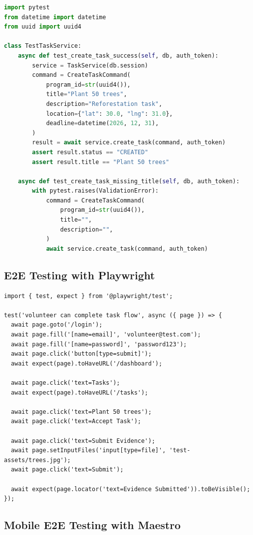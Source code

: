 \documentclass[11pt,a4paper]{article}
\begin{document}
\begin{lstlisting}[language=Python, caption=Unit Test Example]
import pytest
from datetime import datetime
from uuid import uuid4

class TestTaskService:
    async def test_create_task_success(self, db, auth_token):
        service = TaskService(db.session)
        command = CreateTaskCommand(
            program_id=str(uuid4()),
            title="Plant 50 trees",
            description="Reforestation task",
            location={"lat": 30.0, "lng": 31.0},
            deadline=datetime(2026, 12, 31),
        )
        result = await service.create_task(command, auth_token)
        assert result.status == "CREATED"
        assert result.title == "Plant 50 trees"

    async def test_create_task_missing_title(self, db, auth_token):
        with pytest.raises(ValidationError):
            command = CreateTaskCommand(
                program_id=str(uuid4()),
                title="",
                description="",
            )
            await service.create_task(command, auth_token)
\end{lstlisting}

\subsection{E2E Testing with Playwright}

\begin{lstlisting}[language={[Sharp]C}, caption=Web E2E Test]
import { test, expect } from '@playwright/test';

test('volunteer can complete task flow', async ({ page }) => {
  await page.goto('/login');
  await page.fill('[name=email]', 'volunteer@test.com');
  await page.fill('[name=password]', 'password123');
  await page.click('button[type=submit]');
  await expect(page).toHaveURL('/dashboard');

  await page.click('text=Tasks');
  await expect(page).toHaveURL('/tasks');

  await page.click('text=Plant 50 trees');
  await page.click('text=Accept Task');

  await page.click('text=Submit Evidence');
  await page.setInputFiles('input[type=file]', 'test-assets/trees.jpg');
  await page.click('text=Submit');

  await expect(page.locator('text=Evidence Submitted')).toBeVisible();
});
\end{lstlisting}

\subsection{Mobile E2E Testing with Maestro}
\end{document}
